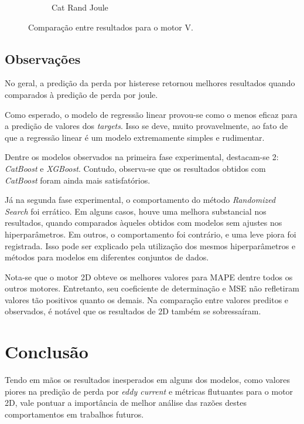 \documentclass{article}
\begin{document}
\begin{figure}[!htbp]
\begin{subfigure}[b]{0.23\textwidth}
        \caption{Cat Rand Joule}
    \end{subfigure}
    \hfill
    \begin{subfigure}[b]{0.23\textwidth}
        \centering
        \null
    \end{subfigure}
    
    \caption{Comparação entre resultados para o motor V.}
\end{figure}

\newpage

\subsection{Observações}

No geral, a predição da perda por histerese retornou melhores resultados quando comparados à predição de perda por joule.

Como esperado, o modelo de regressão linear provou-se como o menos eficaz para a predição de valores dos \textit{targets}. Isso se deve, muito provavelmente, ao fato de que a regressão linear é um modelo extremamente simples e rudimentar.

Dentre os modelos observados na primeira fase experimental, destacam-se 2: \textit{CatBoost} e \textit{XGBoost}. Contudo, observa-se que os resultados obtidos com \textit{CatBoost} foram ainda mais satisfatórios.

Já na segunda fase experimental, o comportamento do método \textit{Randomized Search} foi errático. Em alguns casos, houve uma melhora substancial nos resultados, quando comparados àqueles obtidos com modelos sem ajustes nos hiperparâmetros. Em outros, o comportamento foi contrário, e uma leve piora foi registrada. Isso pode ser explicado pela utilização dos mesmos hiperparâmetros e métodos para modelos em diferentes conjuntos de dados.

Nota-se que o motor 2D obteve os melhores valores para MAPE dentre todos os outros motores. Entretanto, seu coeficiente de determinação e MSE não refletiram valores tão positivos quanto os demais. Na comparação entre valores preditos e observados, é notável que os resultados de 2D também se sobressaíram.

\section{Conclusão}

Tendo em mãos os resultados inesperados em alguns dos modelos, como valores piores na predição de perda por \textit{eddy current} e métricas flutuantes para o motor 2D, vale pontuar a importância de melhor análise das razões destes comportamentos em trabalhos futuros.
\end{document}
